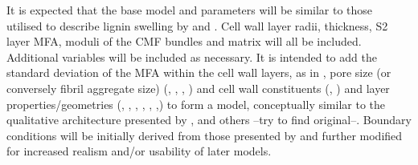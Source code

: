 It is expected that the base model and parameters will be similar to those
utilised to describe lignin swelling by \cite{Alm_ras_2005} and \cite{Yamamoto_1998}. Cell wall layer radii, thickness, S2 layer MFA, moduli of the CMF bundles and matrix will all be included. Additional variables will be included
as necessary. It is intended to add the standard deviation of the MFA within the
cell wall layers, as in \cite{Harrington_1998}, pore size (or conversely fibril
aggregate size) (\cite{Fahl_n_2005}, \cite{Chang_2014}, \cite{BIORESBioRes_07_1_0521_Salmen_OSSR_Struc_Organis_Wood_Polymers}, \cite{Kim_2011}) and cell wall
constituents (\cite{Baba_2009}, \cite{Donaldson_2001}) and layer properties/geometries
(\cite{Bergander_2002}, \cite{grozdits1984differentiation}, \cite{Alm_ras_2005},  \cite{Yamamoto_1998}, \cite{Chang_2014}, \cite{ISI:A1995QJ03000001},) to form a model, conceptually similar to the qualitative
architecture presented by \cite{Mellerowicz_2011}, \cite{Salm_n_2009} and others --try
to find original--. Boundary conditions will be initially derived from those
presented by \cite{Alm_ras_2005} and further modified for increased realism
and/or usability of later models.